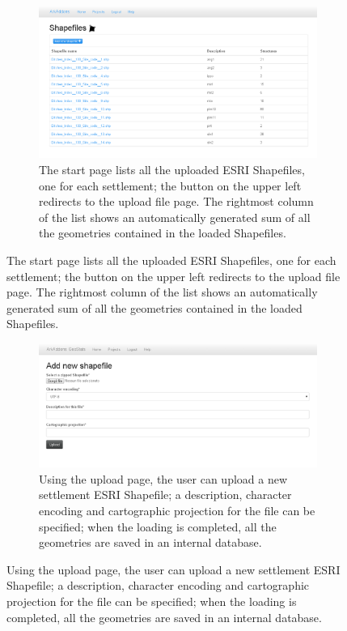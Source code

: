            \vfill

            \begin{figure}[H]
                \ContinuedFloat
                \begin{subfigure}[b]{1\textwidth}
                    \centering
                    \includegraphics[width=1\textwidth]{img/shp-list}
                    \caption{The start page lists all the uploaded ESRI Shapefiles, one for each settlement; the button on the upper left redirects to the upload file page. The rightmost column of the list shows an automatically generated sum of all the geometries contained in the loaded Shapefiles.}
                    \label{fig:shp-list}
                \end{subfigure}
            \end{figure}

            \vfill

            \begin{figure}[H]
                \ContinuedFloat
                \begin{subfigure}[b]{1\textwidth}
                    \centering
                    \includegraphics[width=1\textwidth]{img/shp-upload}
                    \caption{Using the upload page, the user can upload a new settlement ESRI Shapefile; a description, character encoding and cartographic projection for the file can be specified; when the loading is completed, all the geometries are saved in an internal database.}
                    \label{fig:shp-upload}
                \end{subfigure}

            \end{figure}

